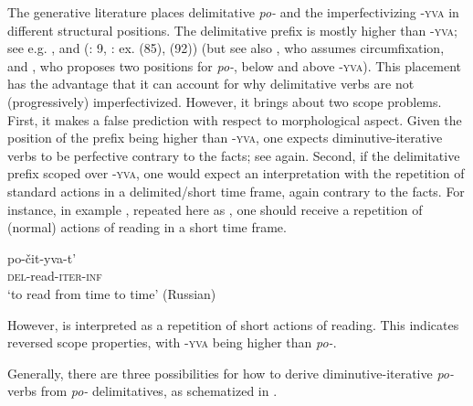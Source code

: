 \documentclass[output=paper,colorlinks,citecolor=brown]{langscibook}
\begin{document}
\newpage
The generative literature places delimitative \textit{po-} and the imperfectivizing \textsc{-yva} in different structural positions. The delimitative prefix is mostly higher than \mbox{\textsc{-yva}}; see e.g. \citet[271--272]{bis:Romanova2004}, \citet[437--438]{bis:Tatevosov2008} and \citeauthor{KlimekJankowska.Blaszczak2022} (\citeyear{KlimekJankowska.Blaszczak2022}: 9, \citeyear{KlimekJankowska.Blaszczak2023}: ex. (85), (92)) (but see also \citealt[408--409]{Souckova2004b}, who assumes circumfixation, and \citealt[377--381]{Jablonska2004}, who proposes two positions for \textit{po-}, below and above \textsc{-yva}). This placement has the advantage that it can account for why delimitative verbs are not (progressively) imperfectivized. However, it brings about two scope problems. First, it makes a false prediction with respect to morphological aspect. Given the position of the prefix being higher than \textsc{-yva}, one expects diminutive-iterative verbs to be perfective contrary to the facts; see  again. Second, if the delimitative prefix scoped over \textsc{-yva}, one would expect an interpretation with the repetition of standard actions in a delimited/short time frame, again contrary to the facts. For instance, in example , repeated here as , one should receive a repetition of (normal) actions of reading in a short time frame.

\ea\label{biskup:ex:readrus}\gll po-čit-yva-t' \\
\textsc{del}-read-\textsc{iter-inf}\\
\glt ‘to read from time to time’ \hfill (Russian)
\z

\noindent However,  is interpreted as a repetition of short actions of reading. This indicates reversed scope properties, with \textsc{-yva} being higher than \textit{po-}. 

Generally, there are three possibilities for how to derive diminutive-iterative \textit{po-}verbs from \textit{po-} delimitatives, as schematized in .

\ea\label{biskup:ex:root}\label{biskup:ex:root.a}
\label{biskup:ex:root.b}
\ex {[ \textit{-yva} + \textit{po-} {\dots} [{\dots} $\sqrt{}$root]]]}\label{biskup:ex:root.c}
\z\z
\end{document}
